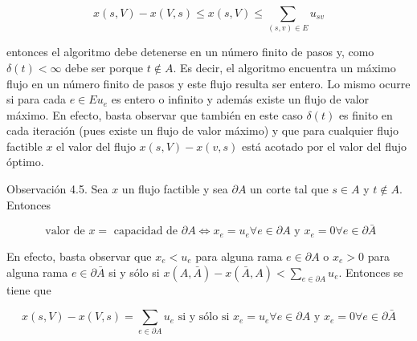 \documentclass[10pt]{article}
\begin{document}
$$
x(s, V)-x(V, s) \leq x(s, V) \leq \sum_{(s, v) \in E} u_{s v}
$$

entonces el algoritmo debe detenerse en un número finito de pasos y, como $\delta(t)<\infty$ debe ser porque $t \notin A$. Es decir, el algoritmo encuentra un máximo flujo en un número finito de pasos y este flujo resulta ser entero. Lo mismo ocurre si para cada $e \in E u_{e}$ es entero o infinito y además existe un flujo de valor máximo. En efecto, basta observar que también en este caso $\delta(t)$ es finito en cada iteración (pues existe un flujo de valor máximo) y que para cualquier flujo factible $x$ el valor del flujo $x(s, V)-x(v, s)$ está acotado por el valor del flujo óptimo.

Observación 4.5. Sea $x$ un flujo factible y sea $\partial A$ un corte tal que $s \in A$ y $t \notin A$. Entonces

$$
\text { valor de } x=\text { capacidad de } \partial A \Longleftrightarrow x_{e}=u_{e} \forall e \in \partial A \text { y } x_{e}=0 \forall e \in \partial \bar{A}
$$

En efecto, basta observar que $x_{e}<u_{e}$ para alguna rama $e \in \partial A$ o $x_{e}>0$ para alguna rama $e \in \partial \bar{A}$ si y sólo si $x(A, \bar{A})-x(\bar{A}, A)<\sum_{e \in \partial A} u_{e}$. Entonces se tiene que

$$
x(s, V)-x(V, s)=\sum_{e \in \partial A} u_{e} \text { si y sólo si } x_{e}=u_{e} \forall e \in \partial A \text { y } x_{e}=0 \forall e \in \partial \bar{A}
$$
\end{document}

